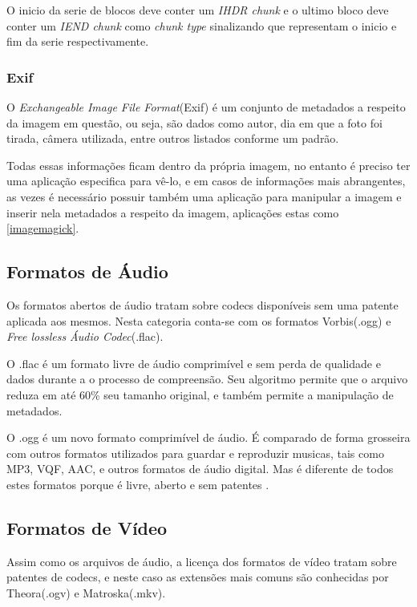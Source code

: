 O inicio da serie de blocos deve conter um \textit{IHDR chunk} e o ultimo bloco deve conter um \textit{IEND chunk} como \textit{chunk type} sinalizando que representam o inicio e fim da serie respectivamente.

\subsubsection{Exif}

O \textit{Exchangeable Image File Format}(Exif) é um conjunto de metadados a respeito da imagem em questão, ou seja, são dados como autor, dia em que a foto foi tirada, câmera utilizada, entre outros listados conforme um padrão.

Todas essas informações ficam dentro da própria imagem, no entanto é preciso ter uma aplicação especifica para vê-lo, e em casos de informações mais abrangentes, as vezes é necessário possuir também uma aplicação para manipular a imagem e inserir nela metadados a respeito da imagem, aplicações estas como \ref{imagemagick}.

\subsection{Formatos de Áudio}

Os formatos abertos de áudio tratam sobre codecs disponíveis sem uma patente aplicada aos mesmos. Nesta categoria conta-se com os formatos Vorbis(.ogg) e \textit{Free lossless Áudio Codec}(.flac).

O .flac é um formato livre de áudio comprimível e sem perda de qualidade e dados durante a o processo de compreensão. Seu algoritmo permite que o arquivo reduza em até 60\% seu tamanho original, e também permite a manipulação de metadados.

O .ogg é um novo formato comprimível de áudio. 
É comparado de forma grosseira com outros formatos utilizados para guardar e reproduzir musicas, tais como MP3, VQF, AAC, e outros formatos de áudio digital. Mas é diferente de todos estes formatos porque é livre, aberto e sem patentes \cite{XIPH}.

\subsection{Formatos de Vídeo}

Assim como os arquivos de áudio, a licença dos formatos de vídeo tratam sobre patentes de codecs, e neste caso as extensões mais comuns são conhecidas por Theora(.ogv) e Matroska(.mkv).

